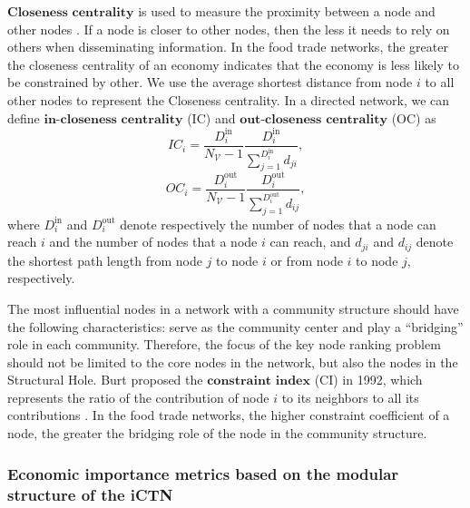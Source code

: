 \documentclass[preprint,3p,times,sort&compress]{elsarticle}
\begin{document}
$\textbf{Closeness centrality}$ is used to measure the proximity between a node and other nodes \cite{Qi-Fuller-Wu-Wu-Zhang-2012-InfSci}. If a node is closer to other nodes, then the less it needs to rely on others when disseminating information. In the food trade networks, the greater the closeness centrality of an economy indicates that the economy is less likely to be constrained by other. We use the average shortest distance from node $i$ to all other nodes to represent the Closeness centrality. In a directed network, we can define $\textbf{in-closeness centrality}$ (IC) and $\textbf{out-closeness centrality}$ (OC) as
\begin{equation}
IC_i=\frac{D_i^{\mathrm{in}}}{N_\mathscr{V}-1}\frac{D_i^{\mathrm{in}}}{\sum _{j=1}^{D_i^{\mathrm{in}}}d_{ji}},
\label{Eq:centrality:closeness:in}
\end{equation}
\begin{equation}
OC_i=\frac{D_i^\mathrm{out}}{N_\mathscr{V}-1}\frac{D_i^\mathrm{out}}{\sum _{j=1}^{D_i^\mathrm{out}}d_{ij}},
\label{Eq:centrality:closeness:out}
\end{equation}
where $D_i^{\mathrm{in}}$ and $D_i^\mathrm{out}$ denote respectively the number of nodes that a node can reach $i$ and the number of nodes that a node $i$ can reach, and $d_{ji}$ and $d_{ij}$ denote the shortest path length from node $j$ to node $i$ or from node $i$ to node $j$, respectively.



The most influential nodes in a network with a community structure should have the following characteristics: serve as the community center and play a ``bridging'' role in each community. Therefore, the focus of the key node ranking problem should not be limited to the core nodes in the network, but also the nodes in the Structural Hole. Burt proposed the $\textbf{constraint index}$ (CI) in 1992, which represents the ratio of the contribution of node $i$ to its neighbors to all its contributions \cite{ Burt-2004-AmJSociol}. In the food trade networks, the higher constraint coefficient of a node, the greater the bridging role of the node in the community structure.



\subsubsection{Economic importance metrics based on the modular structure of the iCTN}
\end{document}
